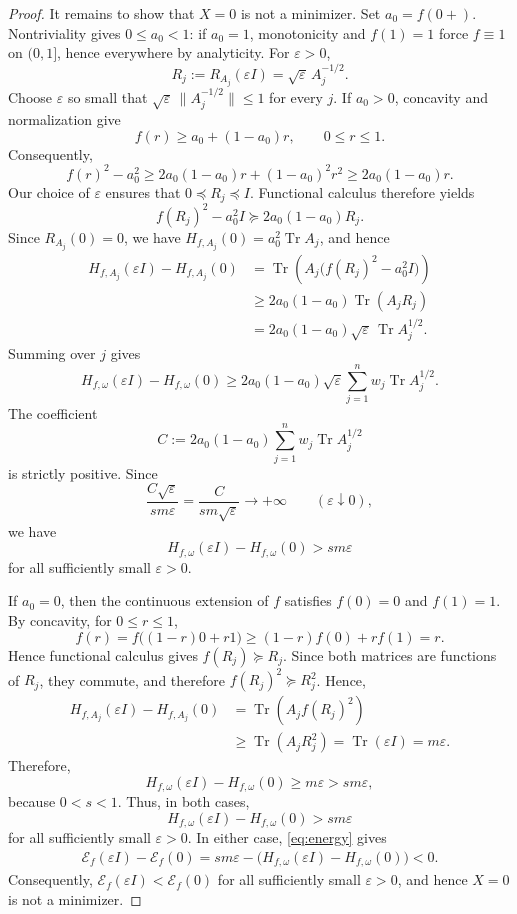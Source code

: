 \documentclass[11pt]{amsart}
\theoremstyle{definition}
\theoremstyle{remark}
\newcommand{\Tr}{\operatorname{Tr}}
\begin{document}
\begin{proof}
	It remains to show that $X=0$ is not a minimizer. Set $a_0=f(0+)$.  Nontriviality gives
		$0\le a_0<1$: if $a_0=1$, monotonicity and $f(1)=1$ force
		$f\equiv1$ on $(0,1]$, hence everywhere by analyticity.  For
		$\varepsilon>0$,
		\[
		R_j:=R_{A_j}(\varepsilon I)=\sqrt{\varepsilon}\,A_j^{-1/2}.
		\]
		Choose $\varepsilon$ so small that
		$\sqrt{\varepsilon}\,\|A_j^{-1/2}\|\le1$ for every $j$.
	If $a_0>0$, concavity and normalization give
		\[
		f(r)\ge a_0+(1-a_0)r,\qquad 0\le r\le1.
		\]
		Consequently,
		\[
		f(r)^2-a_0^2
		\ge2a_0(1-a_0)r+(1-a_0)^2r^2
		\ge2a_0(1-a_0)r.
		\]
		Our choice of $\varepsilon$ ensures that $0\preceq R_j\preceq I$.
		Functional calculus therefore yields
		\[
		f(R_j)^2-a_0^2I
		\succeq2a_0(1-a_0)R_j.
		\]
		Since $R_{A_j}(0)=0$, we have
		$H_{f,A_j}(0)=a_0^2\Tr A_j$, and hence
		\begin{align*}
			H_{f,A_j}(\varepsilon I)-H_{f,A_j}(0)
			&=\Tr\!\left(
			A_j\bigl(f(R_j)^2-a_0^2I\bigr)
			\right)\\
			&\ge2a_0(1-a_0)\Tr(A_jR_j)\\
			&=2a_0(1-a_0)\sqrt{\varepsilon}\,
			\Tr A_j^{1/2}.
		\end{align*}
		Summing over $j$ gives
		\[
		H_{f,\omega}(\varepsilon I)-H_{f,\omega}(0)
		\ge2a_0(1-a_0)\sqrt{\varepsilon}
		\sum_{j=1}^n w_j\Tr A_j^{1/2}.
		\]  
		The coefficient
		\[
		C:=2a_0(1-a_0)\sum_{j=1}^n w_j\Tr A_j^{1/2}
		\]
		is strictly positive.  Since
		\[
		\frac{C\sqrt{\varepsilon}}{sm\varepsilon}
		=\frac{C}{sm\sqrt{\varepsilon}}
		\longrightarrow+\infty
		\qquad(\varepsilon\downarrow0),
		\]
		we have
		\[
		H_{f,\omega}(\varepsilon I)-H_{f,\omega}(0)
		>sm\varepsilon
		\]
		for all sufficiently small $\varepsilon>0$.
		
		If $a_0=0$, then the continuous extension of $f$ satisfies
		$f(0)=0$ and $f(1)=1$.  By concavity, for $0\le r\le1$,
		\[
		f(r)
		=f\bigl((1-r)0+r1\bigr)
		\ge(1-r)f(0)+rf(1)
		=r.
		\]
		Hence functional calculus gives $f(R_j)\succeq R_j$.  Since both
		matrices are functions of $R_j$, they commute, and therefore
		$f(R_j)^2\succeq R_j^2$.  Hence,
		\begin{align*}
			H_{f,A_j}(\varepsilon I)-H_{f,A_j}(0)
			&=\Tr\!\left(A_jf(R_j)^2\right)\\
			&\ge\Tr(A_jR_j^2)
			=\Tr(\varepsilon I)
			=m\varepsilon.
		\end{align*}
Therefore,
		\[
		H_{f,\omega}(\varepsilon I)-H_{f,\omega}(0)
		\ge m\varepsilon>sm\varepsilon,
		\]
		because $0<s<1$. Thus, in both cases,
		\[
		H_{f,\omega}(\varepsilon I)-H_{f,\omega}(0)
		>sm\varepsilon
		\]
		for all sufficiently small $\varepsilon>0$.  In either case, \eqref{eq:energy} gives
		\begin{align*}
			\mathcal E_f(\varepsilon I)-\mathcal E_f(0)
			=sm\varepsilon
			-\bigl(
			H_{f,\omega}(\varepsilon I)-H_{f,\omega}(0)
			\bigr)<0.
		\end{align*}
		Consequently,
		$\mathcal E_f(\varepsilon I)<\mathcal E_f(0)$ for all sufficiently
		small $\varepsilon>0$, and hence $X=0$ is not a minimizer.
		
	
	\end{proof}
	
\end{document}
